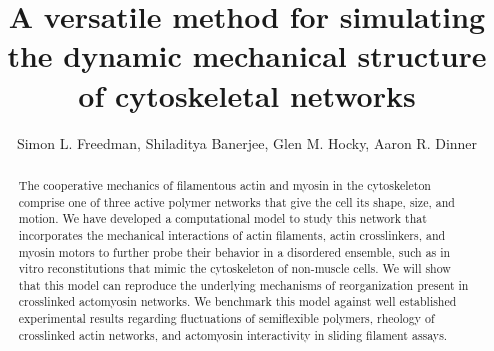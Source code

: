 \documentclass[12pt]{article}
\begin{document}
\title{A versatile method for simulating the dynamic mechanical structure of cytoskeletal networks}
\author{Simon L. Freedman, Shiladitya Banerjee, Glen M. Hocky, Aaron R. Dinner}
\date{}
\maketitle
\begin{abstract}
  The cooperative mechanics of filamentous actin and myosin in the cytoskeleton comprise one of three active polymer
  networks that give the cell its shape, size, and motion. We have developed a computational model to study this network that incorporates 
  the mechanical interactions of actin filaments, actin crosslinkers, and myosin motors to further
  probe their behavior in a disordered ensemble, such as in vitro reconstitutions that mimic the cytoskeleton of non-muscle cells. 
  We will show that this model can reproduce the underlying mechanisms of reorganization
  present in crosslinked actomyosin networks. We benchmark this model against well established experimental results regarding fluctuations of
  semiflexible polymers, rheology of crosslinked actin networks, and actomyosin interactivity in sliding filament assays. 
\end{abstract}
\end{document}
